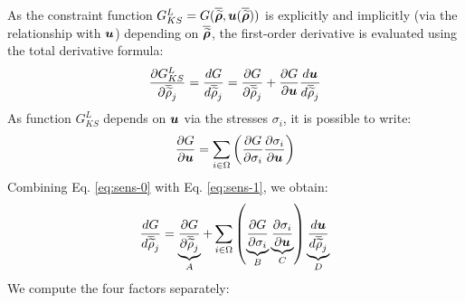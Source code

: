 As the constraint function $G_{KS}^L = G(\bm{\overline{\widetilde{\rho}}}, \bm{u}(\bm{\overline{\widetilde{\rho}}}) )$ is explicitly and implicitly (via the relationship with $\bm{u}$) depending on $\bm{\overline{\widetilde{\rho}}}$, the first-order derivative is evaluated using the total derivative formula:
\begin{equation} \label{eq:sens-0}
    \frac{\partial G_{KS}^L}{\partial\overline{\widetilde{\rho}}_j} = \frac{d G}{d \overline{\widetilde{\rho}}_j} = \frac{\partial G}{\partial \overline{\widetilde{\rho}}_j} + \frac{\partial G}{\partial\bm{u}} \frac{d \bm{u} }{d \overline{\widetilde{\rho}}_j}
\end{equation}
As function $G_{KS}^L$ depends on $\bm{u}$ via the stresses $\sigma_i$, it is possible to write:
\begin{equation} \label{eq:sens-1}
    \frac{\partial G}{\partial\bm{u}} = \sum_{i \in \Omega} \left( \frac{\partial G}{\partial\sigma_i} \frac{\partial\sigma_i}{\partial\bm{u}}\right)
\end{equation}
Combining Eq. \ref{eq:sens-0} with Eq. \ref{eq:sens-1}, we obtain:
\begin{equation} \label{eq:sens-2}
    \frac{d G}{d \overline{\widetilde{\rho}}_j} = \underbrace{\frac{\partial G}{\partial\overline{\widetilde{\rho}}_j}}_A + \sum_{i \in \Omega} \left( \underbrace{\frac{\partial G}{\partial\sigma_i}}_B \underbrace{\frac{\partial\sigma_i}{\partial\bm{u}}}_C \right)  \underbrace{\frac{d \bm{u} }{d \overline{\widetilde{\rho}}_j}}_D
\end{equation}
We compute the four factors separately:

